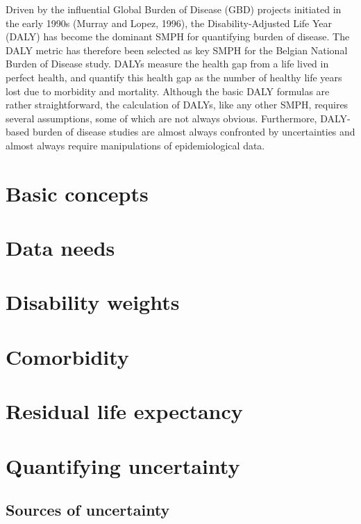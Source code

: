 \documentclass[]{book}
\begin{document}
Driven by the influential Global Burden of Disease (GBD) projects
initiated in the early 1990s (Murray and Lopez, 1996), the
Disability-Adjusted Life Year (DALY) has become the dominant SMPH for
quantifying burden of disease. The DALY metric has therefore been
selected as key SMPH for the Belgian National Burden of Disease study.
DALYs measure the health gap from a life lived in perfect health, and
quantify this health gap as the number of healthy life years lost due to
morbidity and mortality. Although the basic DALY formulas are rather
straightforward, the calculation of DALYs, like any other SMPH, requires
several assumptions, some of which are not always obvious. Furthermore,
DALY-based burden of disease studies are almost always confronted by
uncertainties and almost always require manipulations of epidemiological
data.

\chapter{Basic concepts}\label{basic-concepts}

\chapter{Data needs}\label{data-needs}

\chapter{Disability weights}\label{disability-weights}

\chapter{Comorbidity}\label{comorbidity}

\chapter{Residual life expectancy}\label{residual-life-expectancy}

\chapter{Quantifying uncertainty}\label{quantifying-uncertainty}

\section{Sources of uncertainty}\label{sources-of-uncertainty}
\end{document}
